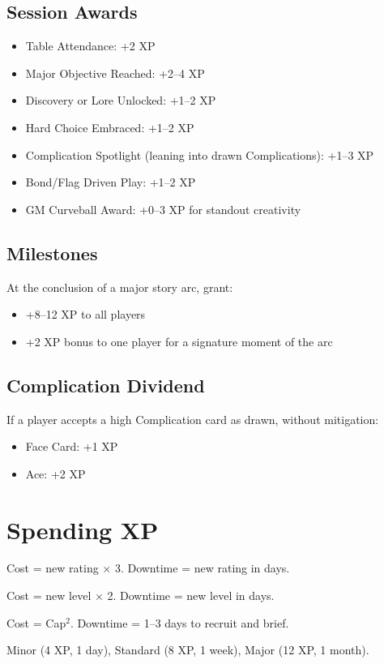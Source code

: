 \documentclass[12pt]{book}
\begin{document}
\subsection*{Session Awards}
\begin{itemize}
  \item Table Attendance: +2 XP  
  \item Major Objective Reached: +2--4 XP  
  \item Discovery or Lore Unlocked: +1--2 XP  
  \item Hard Choice Embraced: +1--2 XP  
  \item Complication Spotlight (leaning into drawn Complications): +1--3 XP  
  \item Bond/Flag Driven Play: +1--2 XP  
  \item GM Curveball Award: +0--3 XP for standout creativity  
\end{itemize}

\subsection*{Milestones}
At the conclusion of a major story arc, grant:
\begin{itemize}
  \item +8--12 XP to all players  
  \item +2 XP bonus to one player for a signature moment of the arc  
\end{itemize}

\subsection*{Complication Dividend}
If a player accepts a high Complication card as drawn, without mitigation:
\begin{itemize}
  \item Face Card: +1 XP  
  \item Ace: +2 XP  
\end{itemize}

\section{Spending XP}

\begin{description}[leftmargin=2cm]
  \item[Attributes:] Cost = new rating $\times$ 3.  
  Downtime = new rating in days.  
  \item[Skills:] Cost = new level $\times$ 2.  
  Downtime = new level in days.  
  \item[On-Screen Followers:] Cost = Cap$^2$.  
  Downtime = 1--3 days to recruit and brief.  
  \item[Off-Screen Assets:] Minor (4 XP, 1 day), Standard (8 XP, 1 week), Major (12 XP, 1 month).  
\end{description}
\end{document}
